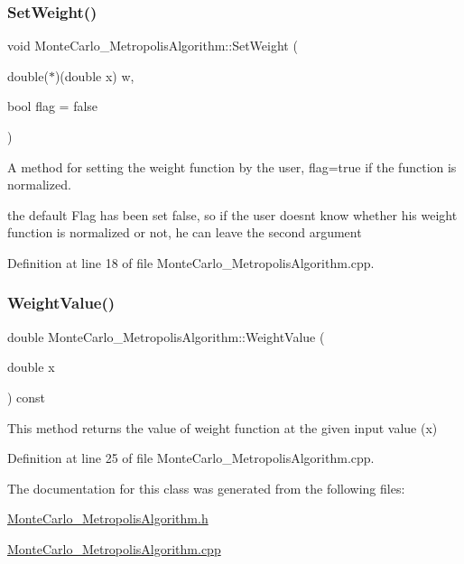 \subsubsection{\texorpdfstring{Set\+Weight()}{SetWeight()}}
{\footnotesize\ttfamily void Monte\+Carlo\+\_\+\+Metropolis\+Algorithm\+::\+Set\+Weight (\begin{DoxyParamCaption}\item[{double($\ast$)(double x)}]{w,  }\item[{bool}]{flag = {\ttfamily false} }\end{DoxyParamCaption})}



A method for setting the weight function by the user, flag=true if the function is normalized. 

the default Flag has been set false, so if the user doesn\textquotesingle{}t know whether his weight function is normalized or not, he can leave the second argument 

Definition at line 18 of file Monte\+Carlo\+\_\+\+Metropolis\+Algorithm.\+cpp.

\mbox{\label{class_monte_carlo___metropolis_algorithm_a5295f6e5691292d833da48105b13ece4}} 
\subsubsection{\texorpdfstring{Weight\+Value()}{WeightValue()}}
{\footnotesize\ttfamily double Monte\+Carlo\+\_\+\+Metropolis\+Algorithm\+::\+Weight\+Value (\begin{DoxyParamCaption}\item[{double}]{x }\end{DoxyParamCaption}) const}



This method returns the value of weight function at the given input value (x) 



Definition at line 25 of file Monte\+Carlo\+\_\+\+Metropolis\+Algorithm.\+cpp.



The documentation for this class was generated from the following files\+:\begin{DoxyCompactItemize}
\item 
\hyperlink{_monte_carlo___metropolis_algorithm_8h}{Monte\+Carlo\+\_\+\+Metropolis\+Algorithm.\+h}\item 
\hyperlink{_monte_carlo___metropolis_algorithm_8cpp}{Monte\+Carlo\+\_\+\+Metropolis\+Algorithm.\+cpp}\end{DoxyCompactItemize}
